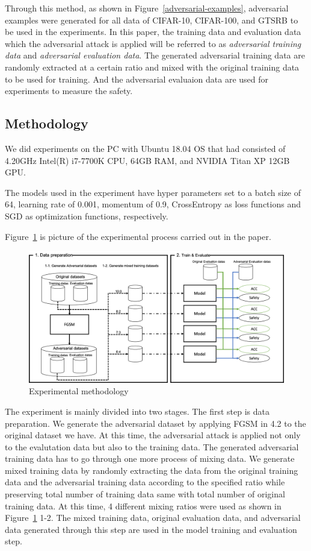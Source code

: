 \documentclass[journal,article,submit,moreauthors,pdftex]{Definitions/mdpi}
\begin{document}
Through this method, as shown in Figure~\ref{adversarial-examples}, adversarial examples were generated for all data of CIFAR-10, CIFAR-100, and GTSRB to be used in the experiments.
In this paper, the training data and evaluation data which the adversarial attack is applied will be referred to as {\it adversarial training data} and {\it adversarial evaluation data}.
The generated adversarial training data are randomly extracted at a certain ratio and mixed with the original training data to be used for training.
And the adversarial evaluaion data are used for experiments to measure the safety.

\subsection{Methodology}

We did experiments on the PC with Ubuntu 18.04 OS that had consisted of 4.20GHz Intel(R) i7-7700K CPU, 64GB RAM, and NVIDIA Titan XP 12GB GPU.

The models used in the experiment have hyper parameters set to a batch size of 64, learning rate of 0.001, momentum of 0.9, CrossEntropy as loss functions and SGD as optimization functions, respectively.

Figure~\ref{methodology} is picture of the experimental process carried out in the paper.

\begin{figure}[H]
\includegraphics[width=13 cm]{Definitions/methodology.png}
\caption{Experimental methodology\label{methodology}}
\end{figure} 

The experiment is mainly divided into two stages.
The first step is data preparation. 
We generate the adversarial dataset by applying FGSM in 4.2 to the original dataset we have.
At this time, the adversarial attack is applied not only to the evalutation data but also to the training data.
The generated adversarial training data has to go through one more process of mixing data.
We generate mixed training data by randomly extracting the data from the original training data and the adversarial training data according to the specified ratio while preserving total number of training data same with total number of original training data.
At this time, 4 different mixing ratios were used as shown in Figure~\ref{methodology} 1-2.
The mixed training data, original evaluation data, and adversarial data generated through this step are used in the model training and evaluation step.
\end{document}
